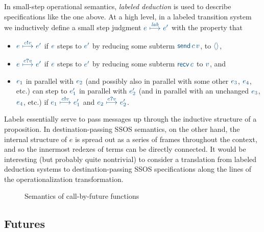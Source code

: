In small-step operational semantics, {\it labeled deduction} is used
to describe specifications like the one above. At a high level,
in a labeled transition system we
inductively define a small step judgment $\obj{e
  ~{\stackrel{\footnotesize{\it lab}}{\longmapsto}}~ e'}$ with the
property that \smallskip
\begin{itemize}
\item $\obj{e ~{\stackrel{\footnotesize{c{\textbf{!}}v}}{\longmapsto}}~
e'}$ if $\obj{e}$ steps to $\obj{e'}$ by reducing some subterm 
$\obj{{\sf send}\,c\,v}$,
to $\obj{\langle\rangle}$,
\item $\obj{e
~{\stackrel{\footnotesize{c{\textbf{?}}v}}{\longmapsto}}~ e'}$ if $\obj{e}$
steps to $\obj{e'}$ by reducing some subterm $\obj{{\sf recv}\,c}$ to 
$\obj{v}$, and 
\item $\obj{e_1}$ in parallel with $\obj{e_2}$ (and possibly also in
  parallel with some other $\obj{e_3}$, $\obj{e_4}$, etc.) can step to
  $\obj{e_1'}$ in parallel with $\obj{e_2'}$ (and in parallel with an
  unchanged $\obj{e_3}$, $\obj{e_4}$, etc.) if $\obj{e_1
    ~{\stackrel{\footnotesize{c{\textbf{!}}v}}{\longmapsto}}~ e_1'}$
  and $\obj{e_2
    ~{\stackrel{\footnotesize{c{\textbf{?}}v}}{\longmapsto}}~ e_2'}$.
\end{itemize}
\smallskip 
%
Labels essentially serve to pass messages up through the inductive
structure of a proposition.  In destination-passing SSOS semantics, on
the other hand, the internal structure of $e$ is spread out as a
series of frames throughout the context, and so the innermost redexes
of terms can be directly connected. It would be interesting (but
probably quite nontrivial) to consider a translation from labeled
deduction systems to destination-passing SSOS specifications along the
lines of the operationalization transformation.


\begin{figure}
\caption{Semantics of call-by-future functions}
\label{fig:dest-futures}
\end{figure}

\subsection{Futures}
\label{sec:dest-futures}

